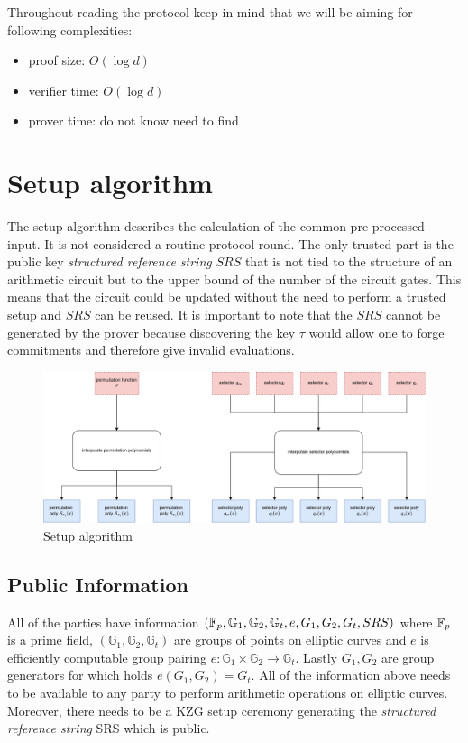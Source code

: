 Throughout reading the protocol keep in mind that we will be aiming for following complexities:
\begin{itemize}
    \item proof size: $O(\log{d})$
    \item verifier time: $O(\log{d})$
    \item prover time: do not know need to find
\end{itemize}

\section{Setup algorithm}
\label{chap:round0}
The setup algorithm describes the calculation of the common pre-processed input. It is not considered a routine protocol round. The only trusted part is the public key \textit{structured reference string} $SRS$ that is not tied to the structure of an arithmetic circuit but to the upper bound of the number of the circuit gates. This means that the circuit could be updated without the need to perform a trusted setup and $SRS$ can be reused. It is important to note that the $SRS$ cannot be generated by the prover because discovering the key $\tau$ would allow one to forge commitments and therefore give invalid evaluations.

\begin{figure}[H]
    \centering
    \includegraphics[width=1\linewidth]{round-figures/setup/round0.drawio.png}
    \caption{Setup algorithm}
    
\end{figure}


\subsection{Public Information }
All of the parties have information $(\mathbb{F}_p, \mathbb{G}_1, \mathbb{G}_2, \mathbb{G}_t, e, G_1, G_2, G_t, SRS)$ where $\mathbb{F}_p$ is a prime field, $(\mathbb{G}_1, \mathbb{G}_2, \mathbb{G}_t)$ are groups of points on elliptic curves and $e$ is efficiently computable group pairing $e: \mathbb{G}_1 \times \mathbb{G}_2 \rightarrow \mathbb{G}_t$. Lastly $G_1, G_2$ are group generators for which holds $e(G_1, G_2) = G_t$. All of the information above needs to be available to any party to perform arithmetic operations on elliptic curves. Moreover, there needs to be a KZG setup ceremony generating the \textit{structured reference string} SRS which is public.

